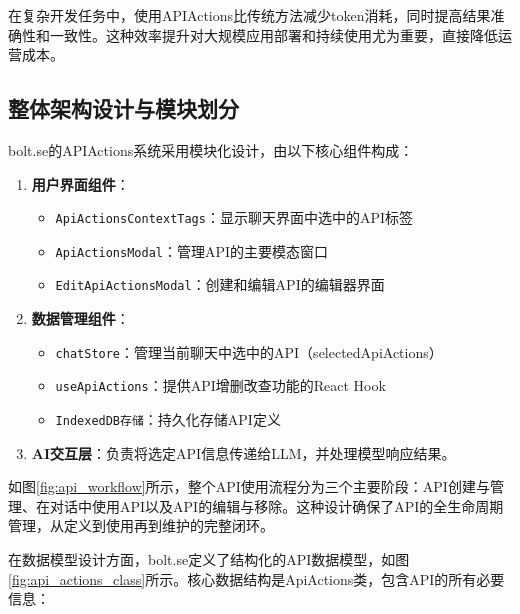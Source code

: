 在复杂开发任务中，使用APIActions比传统方法减少token消耗，同时提高结果准确性和一致性。这种效率提升对大规模应用部署和持续使用尤为重要，直接降低运营成本。

\subsection{整体架构设计与模块划分}
bolt.se的APIActions系统采用模块化设计，由以下核心组件构成：

\begin{enumerate}
  \item \textbf{用户界面组件}：
    \begin{itemize}
      \item \texttt{ApiActionsContextTags}：显示聊天界面中选中的API标签
      \item \texttt{ApiActionsModal}：管理API的主要模态窗口
      \item \texttt{EditApiActionsModal}：创建和编辑API的编辑器界面
    \end{itemize}
  
  \item \textbf{数据管理组件}：
    \begin{itemize}
      \item \texttt{chatStore}：管理当前聊天中选中的API（selectedApiActions）
      \item \texttt{useApiActions}：提供API增删改查功能的React Hook
      \item \texttt{IndexedDB存储}：持久化存储API定义
    \end{itemize}
  
  \item \textbf{AI交互层}：负责将选定API信息传递给LLM，并处理模型响应结果。
\end{enumerate}

如图\ref{fig:api_workflow}所示，整个API使用流程分为三个主要阶段：API创建与管理、在对话中使用API以及API的编辑与移除。这种设计确保了API的全生命周期管理，从定义到使用再到维护的完整闭环。

在数据模型设计方面，bolt.se定义了结构化的API数据模型，如图\ref{fig:api_actions_class}所示。核心数据结构是ApiActions类，包含API的所有必要信息：

